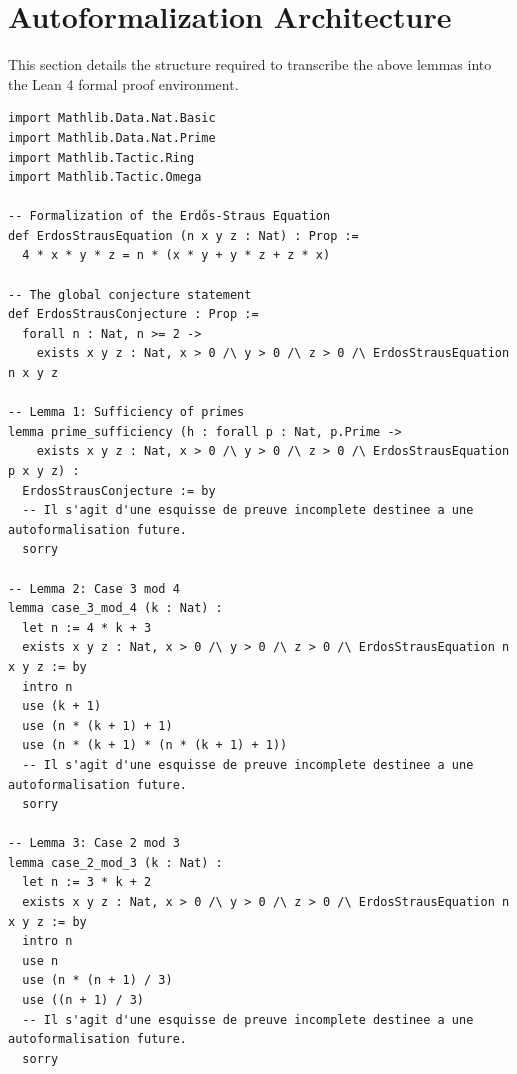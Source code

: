 \documentclass[12pt, a4paper]{article}
\begin{document}
\newpage
\section{Autoformalization Architecture}

This section details the structure required to transcribe the above lemmas into the Lean 4 formal proof environment.

\begin{verbatim}
import Mathlib.Data.Nat.Basic
import Mathlib.Data.Nat.Prime
import Mathlib.Tactic.Ring
import Mathlib.Tactic.Omega

-- Formalization of the Erdős-Straus Equation
def ErdosStrausEquation (n x y z : Nat) : Prop :=
  4 * x * y * z = n * (x * y + y * z + z * x)

-- The global conjecture statement
def ErdosStrausConjecture : Prop :=
  forall n : Nat, n >= 2 ->
    exists x y z : Nat, x > 0 /\ y > 0 /\ z > 0 /\ ErdosStrausEquation n x y z

-- Lemma 1: Sufficiency of primes
lemma prime_sufficiency (h : forall p : Nat, p.Prime ->
    exists x y z : Nat, x > 0 /\ y > 0 /\ z > 0 /\ ErdosStrausEquation p x y z) :
  ErdosStrausConjecture := by
  -- Il s'agit d'une esquisse de preuve incomplete destinee a une autoformalisation future.
  sorry

-- Lemma 2: Case 3 mod 4
lemma case_3_mod_4 (k : Nat) :
  let n := 4 * k + 3
  exists x y z : Nat, x > 0 /\ y > 0 /\ z > 0 /\ ErdosStrausEquation n x y z := by
  intro n
  use (k + 1)
  use (n * (k + 1) + 1)
  use (n * (k + 1) * (n * (k + 1) + 1))
  -- Il s'agit d'une esquisse de preuve incomplete destinee a une autoformalisation future.
  sorry

-- Lemma 3: Case 2 mod 3
lemma case_2_mod_3 (k : Nat) :
  let n := 3 * k + 2
  exists x y z : Nat, x > 0 /\ y > 0 /\ z > 0 /\ ErdosStrausEquation n x y z := by
  intro n
  use n
  use (n * (n + 1) / 3)
  use ((n + 1) / 3)
  -- Il s'agit d'une esquisse de preuve incomplete destinee a une autoformalisation future.
  sorry
\end{verbatim}
\end{document}
